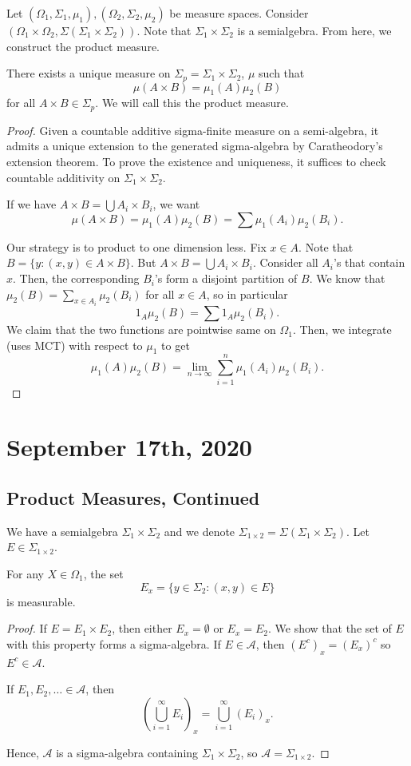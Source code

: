 \documentclass[11pt]{scrartcl}
\begin{document}
Let $(\Omega_1, \Sigma_1, \mu_1), (\Omega_2, \Sigma_2, \mu_2)$ be measure spaces.  Consider $(\Omega_1 \times \Omega_2, \Sigma(\Sigma_1 \times \Sigma_2))$.  Note that $\Sigma_1 \times \Sigma_2$ is a semialgebra.  From here, we construct the product measure.
\begin{thm} There exists a unique measure on $\Sigma_p = \Sigma_1 \times \Sigma_2$, $\mu$ such that 
$$\mu(A \times B) = \mu_1(A) \mu_2(B)$$
for all $A \times B \in \Sigma_p$.  We will call this the product measure.
\end{thm}
\begin{proof}
Given a countable additive sigma-finite measure on a semi-algebra, it admits a unique extension to the generated sigma-algebra by Caratheodory's extension theorem.  To prove the existence and uniqueness, it suffices to check countable additivity on $\Sigma_1 \times \Sigma_2$.  

If we have $A \times B = \bigcup A_i \times B_i$, we want $$\mu(A \times B) = \mu_1(A)\mu_2(B) = \sum \mu_1(A_i)\mu_2(B_i).$$

Our strategy is to product to one dimension less. Fix $x \in A$.  Note that $B = \{y : (x, y) \in A \times B\}$.  But $A \times B = \bigcup A_i \times B_i.$  Consider all $A_i$'s that contain $x$.  Then, the corresponding $B_i$'s form a disjoint partition of $B$.  We know that $\mu_2(B) = \sum_{x \in A_i} \mu_2(B_i)$ for all $x \in A$, so in particular
$$1_A\mu_2(B) = \sum 1_A \mu_2(B_i).$$
We claim that the two functions are pointwise same on $\Omega_1$.  Then, we integrate (uses MCT) with respect to $\mu_1$ to get
$$\mu_1(A)\mu_2(B) = \lim_{n \rightarrow \infty} \sum_{i=1}^n \mu_1(A_i)\mu_2(B_i).$$
\end{proof}
\pagebreak
\section{September 17th, 2020}
\subsection{Product Measures, Continued}
We have a semialgebra $\Sigma_1 \times \Sigma_2$ and we denote $\Sigma_{1 \times 2} = \Sigma(\Sigma_1 \times \Sigma_2)$.  Let $E \in \Sigma_{1 \times 2}$.
\begin{lemma} For any $X \in \Omega_1$, the set
$$E_x = \{y \in \Sigma_2 : (x, y) \in E\}$$
is measurable.
\end{lemma}
\begin{proof}
If $E = E_1 \times E_2$, then either $E_x = \emptyset$ or $E_x = E_2$.  We show that the set of $E$ with this property forms a sigma-algebra.  If $E \in \mathcal{A}$, then $(E^c)_x = (E_x)^c$ so $E^c \in \mathcal{A}$.  

If $E_1, E_2, \dots \in \mathcal A$, then
$$\left (\bigcup_{i=1}^\infty E_i\right )_x = \bigcup_{i=1}^\infty (E_i)_x.$$

Hence, $\mathcal{A}$ is a sigma-algebra containing $\Sigma_1 \times \Sigma_2$, so $\mathcal{A} = \Sigma_{1 \times 2}$.
\end{proof}
\end{document}

